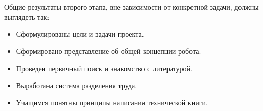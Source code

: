 {\hypertarget{lesson24x5}{}}\\\\

Общие результаты второго этапа, вне зависимости от конкретной задачи, должны выглядеть так:

\begin{itemize}
	\item Сформулированы цели и задачи проекта.
	\item Сформировано представление об общей концепции робота.
	\item Проведен первичный поиск и знакомство с литературой.
	\item Выработана система разделения труда.
	\item Учащимся понятны принципы написания технической книги.
\end{itemize}